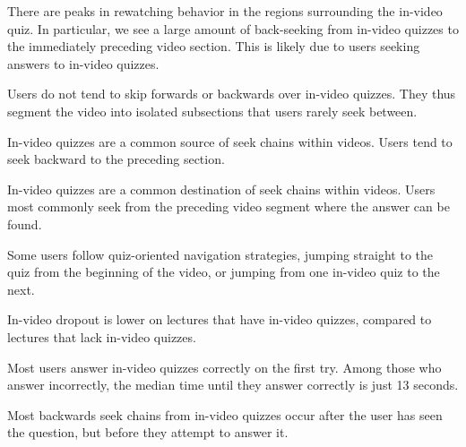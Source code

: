 \documentclass{sigchi}
\begin{document}
\begin{compactitem}
\item There are peaks in rewatching behavior in the regions surrounding the in-video quiz. In particular, we see a large amount of back-seeking from in-video quizzes to the immediately preceding video section. This is likely due to users seeking answers to in-video quizzes.
\item Users do not tend to skip forwards or backwards over in-video quizzes. They thus segment the video into isolated subsections that users rarely seek between.
\item In-video quizzes are a common source of seek chains within videos. Users tend to seek backward to the preceding section. %
\item In-video quizzes are a common destination of seek chains within videos. Users most commonly seek from the preceding video segment where the answer can be found.
\item Some users follow quiz-oriented navigation strategies, jumping straight to the quiz from the beginning of the video, or jumping from one in-video quiz to the next.
\item In-video dropout is lower on lectures that have in-video quizzes, compared to lectures that lack in-video quizzes.
\item Most users answer in-video quizzes correctly on the first try. Among those who answer incorrectly, the median time until they answer correctly is just 13 seconds.
\item Most backwards seek chains from in-video quizzes occur after the user has seen the question, but before they attempt to answer it.
\end{compactitem}

\end{document}
